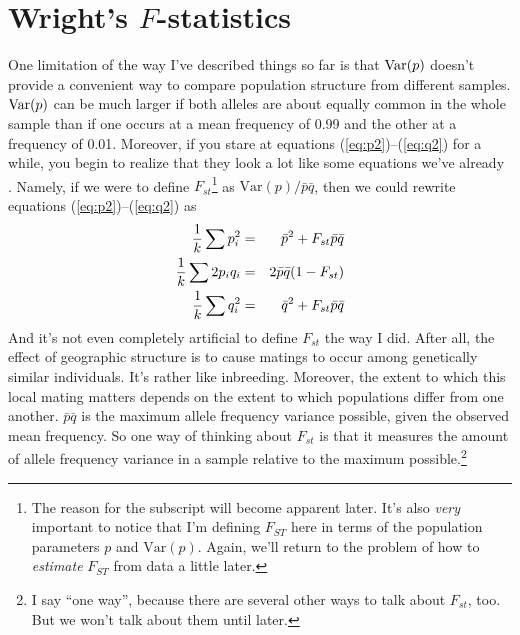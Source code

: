 \documentclass[12pt]{article}
\begin{document}
\section*{Wright's $F$-statistics}

One limitation of the way I've described things so far is that
$\hbox{Var}(p)$ doesn't provide a convenient way to compare population
structure from different samples. $\hbox{Var}(p)$ can be much larger
if both alleles are about equally common in the whole sample than if
one occurs at a mean frequency of 0.99 and the other at a frequency of
0.01. Moreover, if you stare at equations (\ref{eq:p2})--(\ref{eq:q2})
for a while, you begin to realize that they look a lot like some
equations we've already
.
Namely, if we were to define $F_{st}$\footnote{The reason for the
  subscript will become apparent later. It's also {\it very\/}
  important to notice that I'm defining $F_{ST}$ here in terms of the
  population parameters $p$ and $\mbox{Var}(p)$. Again, we'll return
  to the problem of how to {\it estimate\/} $F_{ST}$ from data a
  little later.} as $\mbox{Var}(p)/\bar p\bar q$, then we could
rewrite equations (\ref{eq:p2})--(\ref{eq:q2}) as
\begin{eqnarray}
\frac{1}{k}\sum p_i^2 &=& \bar p^2 + F_{st}\bar p \bar q \label{eq:p2-f} \\
\frac{1}{k}\sum 2p_iq_i &=& 2\bar p\bar q(1 - F_{st}) \label{eq:2pq-f} \\
\frac{1}{k}\sum q_i^2   &=& \bar q^2 + F_{st}\bar p \bar q \label{eq:q2-f}
\end{eqnarray}
And it's not even completely artificial to define $F_{st}$ the way I
did. After all, the effect of geographic structure is to cause matings
to occur among genetically similar individuals. It's rather like
inbreeding. Moreover, the extent to which this local mating matters
depends on the extent to which populations differ from one
another. $\bar p\bar q$ is the maximum allele frequency variance
possible, given the observed mean frequency. So one way of thinking
about $F_{st}$ is that it measures the amount of allele frequency
variance in a sample relative to the maximum possible.\footnote{I say
  ``one way'', because there are several other ways to talk about
  $F_{st}$, too. But we won't talk about them until later.}
\end{document}
